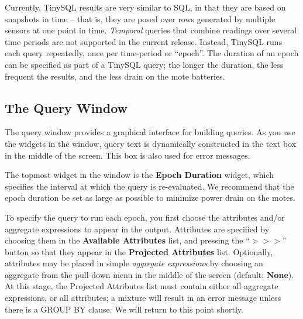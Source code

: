 \documentclass[11pt]{article}
\renewcommand{\baselinestretch}{1.2}
\begin{document}
Currently, TinySQL results are very similar to SQL, in that they
are based on snapshots in time -- that is, they are
posed over rows generated by multiple sensors at one
point in time.  {\it Temporal} queries that combine
readings over several time periods are not supported in the current
release.  Instead, TinySQL runs each query repeatedly, once per
time-period or ``epoch''.  The duration of an epoch can be specified
as part of a TinySQL query; the longer the duration, the less
frequent the results, and the less drain on the mote batteries.


\subsection{The Query Window}
\label{sec:querywindow}
The query window provides a graphical interface for building queries.
As you use the widgets in the window, query text is dynamically
constructed in the text box in the middle of the screen.  This box is
also used for error messages.

\vspace{.1in}
\renewcommand{\baselinestretch}{1.0}\rm
{}
\renewcommand{\baselinestretch}{1.2}\rm
\vspace{.1in}

The topmost widget in the window is the {\bf Epoch
  Duration} widget,
which specifies the interval at which the query is re-evaluated.
We recommend that the epoch duration be set as large as possible to
minimize power drain on the motes.

To specify the query to run each epoch, you first choose the
attributes and/or aggregate expressions to appear in the output.
Attributes are specified by choosing them in the {\bf Available
Attributes} list, and pressing the ``$>>>$'' button so that they
appear in the {\bf Projected Attributes} list.  Optionally, attributes
may be placed in simple {\em aggregate} {\em
expressions} by choosing an aggregate from the
pull-down menu in the middle of the screen (default: {\bf None}).  At
this stage, the Projected Attributes list must
contain either all aggregate expressions, or all attributes; a mixture
will result in an error message unless there is a GROUP BY
clause.  We will return to this point shortly.
\end{document}
